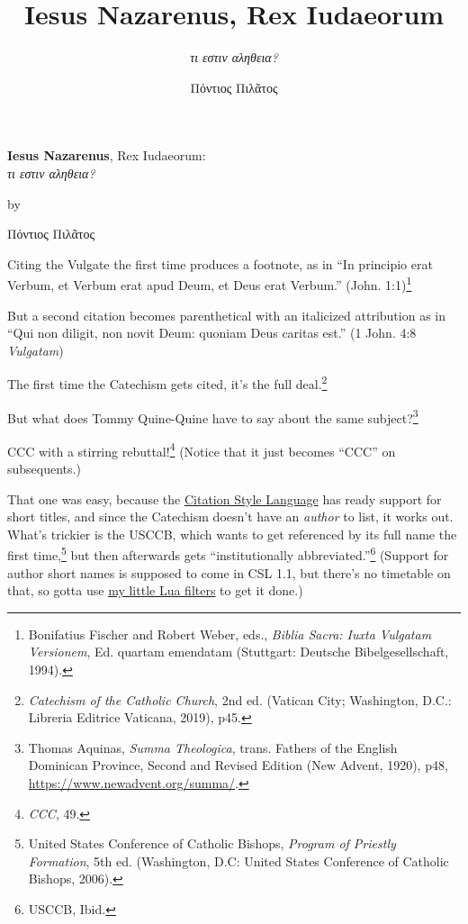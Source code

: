 \documentclass[
    12pt,
    letterpaper,
    oneside,
    noraggedright
]{turabian-researchpaper}
\title{{\textbf{Iesus Nazarenus}, Rex Iudaeorum}}
\subtitle{{\emph{τι εστιν αληθεια?}}}
\author{{Πόντιος Πιλᾶτος}}
\begin{document}
    \begin{center}

    \thispagestyle{empty}
    \vspace*{1in}
    \begin{singlespace}
        {\textbf{Iesus Nazarenus}, Rex Iudaeorum}:\\
    {\emph{τι εστιν αληθεια?}}
        \end{singlespace}
    \vspace{2in - \baselineskip}

    by
    \vspace{2in - \baselineskip}

    {Πόντιος Πιλᾶτος}

    \vspace{2in - \baselineskip}

    \end{center}
    \newpage
    \setcounter{page}{1}

Citing the Vulgate the first time produces a footnote, as in ``In
principio erat Verbum, et Verbum erat apud Deum, et Deus erat Verbum.''
{(John. 1:1)\footnote{Bonifatius Fischer and Robert Weber, eds.,
  \emph{Biblia Sacra: Iuxta Vulgatam Versionem}, Ed. quartam emendatam
  (Stuttgart: Deutsche Bibelgesellschaft, 1994).}}

But a second citation becomes parenthetical with an italicized
attribution as in ``Qui non diligit, non novit Deum: quoniam Deus
caritas est.'' {(1 John. 4:8{ \emph{Vulgatam}})}

The first time the Catechism gets cited, it's the full deal.\footnote{\emph{Catechism
  of the Catholic Church}, 2nd ed. (Vatican City; Washington, D.C.:
  Libreria Editrice Vaticana, 2019), p45.}

But what does Tommy Quine-Quine have to say about the same
subject?\footnote{Thomas Aquinas, \emph{Summa Theologica}, trans.
  Fathers of the English Dominican Province, Second and Revised Edition
  (New Advent, 1920), p48, \url{https://www.newadvent.org/summa/}.}

CCC with a stirring rebuttal!\footnote{\emph{CCC}, 49.} (Notice that it
just becomes ``CCC'' on subsequents.)

That one was easy, because the
\href{https://citationstyles.org/}{Citation Style Language} has ready
support for short titles, and since the Catechism doesn't have an
\emph{author} to list, it works out. What's trickier is the USCCB, which
wants to get referenced by its full name the first time,\footnote{United
  States Conference of Catholic Bishops, \emph{Program of Priestly
  Formation}, 5th ed. (Washington, D.C: United States Conference of
  Catholic Bishops, 2006).} but then afterwards gets ``institutionally
abbreviated.''\footnote{USCCB, Ibid.} (Support for author short names is
supposed to come in CSL 1.1, but there's no timetable on that, so gotta
use
\href{https://github.com/sjml/paper/tree/main/paper/resources/project_template/.paper_resources/filters}{my
little Lua filters} to get it done.)
\end{document}
